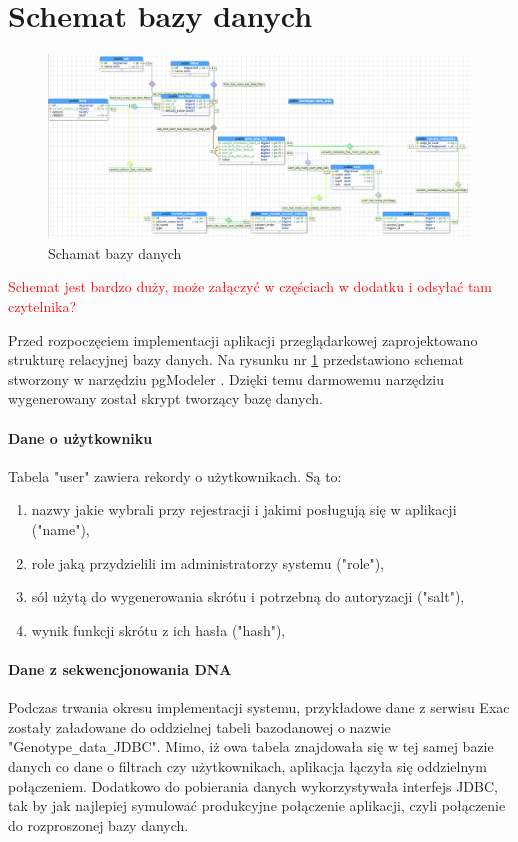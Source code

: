 \documentclass[a4paper,12pt,twoside]{article}
\begin{document}
\newpage
\section{Schemat bazy danych}

\begin{figure}
  \includegraphics[width=\linewidth]{obrazy/aplikacja/database.png}
  \caption{Schamat bazy danych}
  \label{fig:bazadanych}
\end{figure}

\newpage

\textcolor{red}{
Schemat jest bardzo duży, może załączyć w częściach w dodatku i odsyłać tam czytelnika?
}

Przed rozpoczęciem implementacji aplikacji przeglądarkowej zaprojektowano strukturę 
relacyjnej bazy danych. Na rysunku nr \ref{fig:bazadanych} przedstawiono schemat stworzony
w narzędziu pgModeler \cite{pgModeler}. Dzięki temu darmowemu narzędziu wygenerowany został
skrypt tworzący bazę danych.  

\paragraph{Dane o użytkowniku} Tabela "user" zawiera rekordy o użytkownikach. 
Są to:
\begin{enumerate}[1)]
\item nazwy jakie wybrali przy rejestracji i jakimi posługują się w aplikacji ("name"),
\item role jaką przydzielili im administratorzy systemu ("role"),
\item sól użytą do wygenerowania skrótu i potrzebną do autoryzacji ("salt"),
\item wynik funkcji skrótu z ich hasła ("hash"),
\end{enumerate}

\paragraph{Dane z sekwencjonowania DNA} Podczas trwania okresu implementacji systemu,
przykładowe dane z serwisu Exac zostały załadowane do oddzielnej tabeli bazodanowej o nazwie "Genotype\verb!_!data\verb!_!JDBC". Mimo, iż owa tabela znajdowała się w tej samej bazie danych co 
dane o filtrach czy użytkownikach, aplikacja łączyła się oddzielnym połączeniem. 
Dodatkowo do pobierania danych wykorzystywała interfejs JDBC, tak by jak najlepiej
symulować produkcyjne połączenie aplikacji, czyli połączenie do rozproszonej bazy danych.
\end{document}
